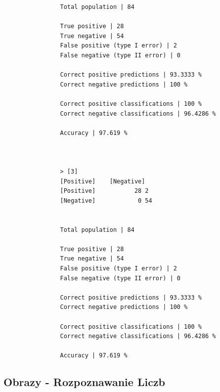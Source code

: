 \documentclass{classrep}
\begin{document}
{{{\begin{lstlisting}
                Total population | 84

                True positive | 28
                True negative | 54
                False positive (type I error) | 2
                False negative (type II error) | 0

                Correct positive predictions | 93.3333 %
                Correct negative predictions | 100 %

                Correct positive classifications | 100 %
                Correct negative classifications | 96.4286 %

                Accuracy | 97.619 %



                > [3]
                [Positive]    [Negative]
                [Positive]           28 2
                [Negative]            0 54


                Total population | 84

                True positive | 28
                True negative | 54
                False positive (type I error) | 2
                False negative (type II error) | 0

                Correct positive predictions | 93.3333 %
                Correct negative predictions | 100 %

                Correct positive classifications | 100 %
                Correct negative classifications | 96.4286 %

                Accuracy | 97.619 %

                \end{lstlisting}
            }
        }
        \subsection{Obrazy - Rozpoznawanie Liczb}
        {
}}
\end{document}
